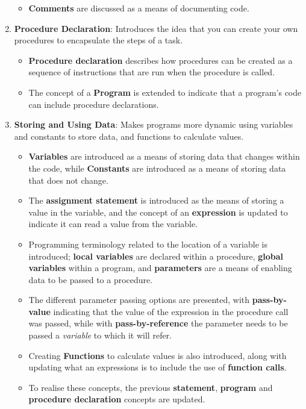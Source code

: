 \begin{enumerate}
\begin{itemize}[noitemsep,nolistsep]
    \item \textbf{Comments} are discussed as a means of documenting code.
  \end{itemize}
  \item \textbf{Procedure Declaration}: Introduces the idea that you can create your own procedures to encapsulate the steps of a task. 
  \begin{itemize}[noitemsep,nolistsep]
     \item \textbf{Procedure declaration} describes how procedures can be created as a sequence of instructions that are run when the procedure is called.
     \item The concept of a \textbf{Program} is extended to indicate that a program's code can include procedure declarations.
   \end{itemize} 
  \item \textbf{Storing and Using Data}: Makes programs more dynamic using variables and constants to store data, and functions to calculate values.
  \begin{itemize}[noitemsep,nolistsep]
    \item \textbf{Variables} are introduced as a means of storing data that changes within the code, while \textbf{Constants} are introduced as a means of storing data that does not change. 
    \item The \textbf{assignment statement} is introduced as the means of storing a value in the variable, and the concept of an \textbf{expression} is updated to indicate it can read a value from the variable.
    \item Programming terminology related to the location of a variable is introduced; \textbf{local variables} are declared within a procedure, \textbf{global variables} within a program, and \textbf{parameters} are a means of enabling data to be passed to a procedure.
    \item The different parameter passing options are presented, with \textbf{pass-by-value} indicating that the value of the expression in the procedure call was passed, while with \textbf{pass-by-reference} the parameter needs to be passed a \emph{variable} to which it will refer.
    \item Creating \textbf{Functions} to calculate values is also introduced, along with updating what an expressions is to include the use of \textbf{function calls}.
    \item To realise these concepts, the previous \textbf{statement}, \textbf{program} and \textbf{procedure declaration} concepts are updated.

\end{itemize}
\end{enumerate}
